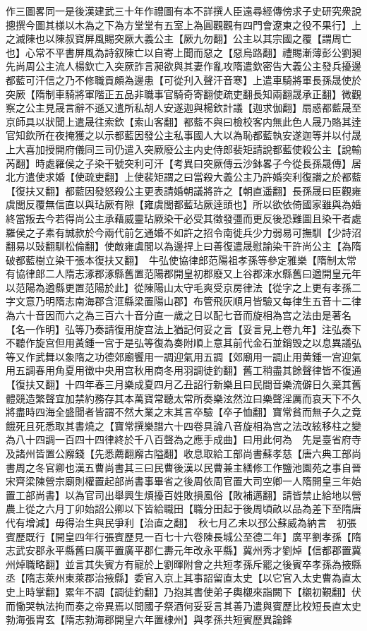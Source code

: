作三圖畧同一是後漢建武三十年作禮圖有本不詳撰人臣遠尋經傳傍求子史研究衆說摠撰今圖其様以木為之下為方堂堂有五室上為圓觀觀有四門會遼東之役不果行】上之滅陳也以陳叔寶屏風賜突厥大義公主【厥九勿翻】公主以其宗國之覆【謂周亡也】心常不平書屏風為詩叙陳亡以自寄上聞而惡之【惡烏路翻】禮賜漸薄彭公劉昶先尚周公主流人楊欽亡入突厥詐言昶欲與其妻作亂攻隋遣欽密告大義公主發兵擾邊都藍可汗信之乃不修職貢頗為邊患【可從刋入聲汗音寒】上遣車騎將軍長孫晟使於突厥【隋制車騎將軍階正五品非職事官騎奇寄翻使疏吏翻長知兩翻晟承正翻】微觀察之公主見晟言辭不遜又遣所私胡人安遂迦與楊欽計議【迦求伽翻】扇惑都藍晟至京師具以狀聞上遣晟往索欽【索山客翻】都藍不與曰檢校客内無此色人晟乃賂其逹官知欽所在夜掩獲之以示都藍因發公主私事國人大以為恥都藍執安遂迦等并以付晟上大喜加授開府儀同三司仍遣入突厥廢公主内史侍郎裴矩請說都藍使殺公主【說輸芮翻】時處羅侯之子染干號突利可汗【考異曰突厥傳云沙鉢畧子今從長孫晟傳】居北方遣使求婚【使疏吏翻】上使裴矩謂之曰當殺大義公主乃許婚突利復譖之於都藍【復扶又翻】都藍因發怒殺公主更表請婚朝議將許之【朝直遥翻】長孫晟曰臣觀雍虞閭反覆無信直以與玷厥有隙【雍虞閭都藍玷厥逹頭也】所以欲依倚國家雖與為婚終當叛去今若得尚公主承藉威靈玷厥染干必受其徵發彊而更反後恐難圖且染干者處羅侯之子素有誠款於今兩代前乞通婚不如許之招令南徙兵少力弱易可撫馴【少詩沼翻易以䜴翻馴松倫翻】使敵雍虞閭以為邊捍上曰善復遣晟慰諭染干許尚公主【為隋破都藍樹立染干張本復扶又翻】　牛弘使協律郎范陽祖孝孫等參定雅樂【隋制太常有協律郎二人隋志涿郡涿縣舊置范陽郡開皇初郡廢又上谷郡淶水縣舊曰遒開皇元年以范陽為遒縣更置范陽於此】從陳陽山太守毛爽受京房律法【從字之上更有孝孫二字文意乃明隋志南海郡含洭縣梁置陽山郡】布管飛灰順月皆驗又每律生五音十二律為六十音因而六之為三百六十音分直一歲之日以配七音而旋相為宫之法由是著名【名一作明】弘等乃奏請復用旋宫法上猶記何妥之言【妥言見上卷九年】注弘奏下不聽作旋宫但用黃鍾一宫于是弘等復為奏附順上意其前代金石並銷毁之以息異議弘等又作武舞以象隋之功德郊廟饗用一調迎氣用五調【郊廟用一調止用黄鍾一宫迎氣用五調春用角夏用徵中央用宫秋用商冬用羽調徒釣翻】舊工稍盡其餘聲律皆不復通【復扶又翻】十四年春三月樂成夏四月乙丑詔行新樂且曰民間音樂流僻日久棄其舊體競造繁聲宜加禁約務存其本萬寶常聽太常所奏樂泫然泣曰樂聲淫厲而哀天下不久將盡時四海全盛聞者皆謂不然大業之末其言卒驗【卒子恤翻】寶常貧而無子久之竟餓死且死悉取其書燒之【寶常撰樂譜六十四卷具論八音旋相為宫之法改絃移柱之變為八十四調一百四十四律終於千八百聲為之應手成曲】曰用此何為　先是臺省府寺及諸州皆置公廨錢【先悉薦翻廨古隘翻】收息取給工部尚書蘇孝慈【唐六典工部尚書周之冬官卿也漢五曹尚書其三曰民曹後漢以民曹兼主繕修工作鹽池園苑之事自晉宋齊梁陳營宗廟則權置起部尚書事畢省之後周依周官置大司空卿一人隋開皇三年始置工部尚書】以為官司出舉興生煩擾百姓敗損風俗【敗補邁翻】請皆禁止給地以營農上從之六月丁卯始詔公卿以下皆給職田【職分田起于後周頃畝以品為差下至隋唐代有增減】毋得治生與民爭利【治直之翻】　秋七月乙未以邳公蘇威為納言　初張賓歷既行【開皇四年行張賓歷見一百七十六卷陳長城公至德二年】廣平劉孝孫【隋志武安郡永平縣舊曰廣平置廣平郡仁夀元年改永平縣】冀州秀才劉焯【信都郡置冀州焯職略翻】並言其失賓方有寵於上劉暉附會之共短孝孫斥罷之後賓卒孝孫為掖縣丞【隋志萊州東萊郡治掖縣】委官入京上其事詔留直太史【以它官入太史曹為直太史上時掌翻】累年不調【調徒釣翻】乃抱其書使弟子輿櫬來詣闕下【櫬初覲翻】伏而慟哭執法拘而奏之帝異焉以問國子祭酒何妥妥言其善乃遣與賓歷比校短長直太史勃海張胄玄【隋志勃海郡開皇六年置棣州】與孝孫共短賓歷異論鋒